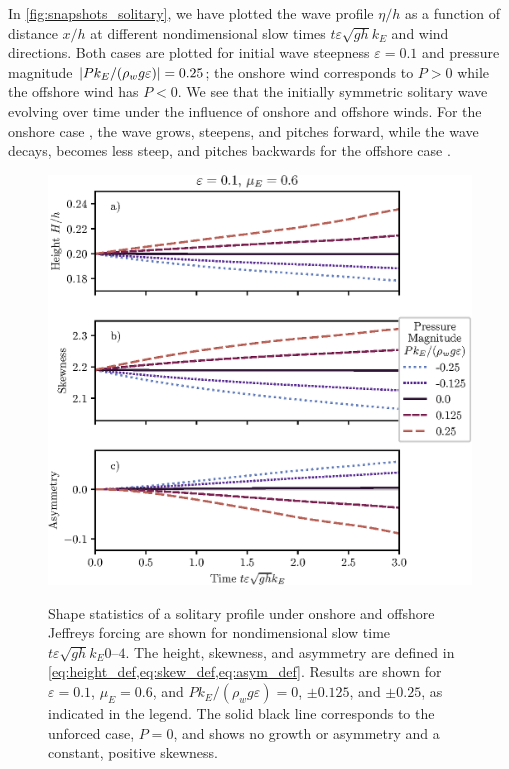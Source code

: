 \documentclass{jfm}
\renewcommand*{\epsilon}{\varepsilon}
\begin{document}
In \cref{fig:snapshots_solitary}, we have plotted the wave profile
$\eta/h$ as a function of distance $x/h$ at different nondimensional
slow times $t \epsilon \sqrt{g h} k_E$ and wind directions.
Both cases are plotted for initial wave steepness $\epsilon = 0.1$ and
pressure magnitude $\abs{P k_E/(\rho_w g \epsilon)} = 0.25$; the onshore
wind  corresponds to $P>0$ while the
offshore wind  has $P<0$.
We see that the initially symmetric solitary wave evolving over time
under the influence of  onshore and
 offshore winds.
For the onshore case , the wave grows,
steepens, and pitches forward, while the wave decays, becomes less
steep, and pitches backwards for the offshore case
.

\begin{figure}
  \centering
  { %
    \label{fig:statistics_solitary:a}
    \label{fig:statistics_solitary:b}
    \label{fig:statistics_solitary:c}
  }
  \includegraphics{Skew-Asymm-No-Peak.eps}
  \caption{
    Shape statistics of a solitary profile under onshore and offshore
    Jeffreys forcing are shown for nondimensional slow time $t \epsilon
    \sqrt{gh} k_E \numrange{0}{4}$.
    The
    height,
    skewness, and
    asymmetry are defined in
    \cref{eq:height_def,eq:skew_def,eq:asym_def}.
    Results are shown for $\epsilon=0.1$, $\mu_E = 0.6$, and $P
    k_E/(\rho_w g \epsilon) = 0$, $\pm 0.125$, and $\pm 0.25$, as
    indicated in the legend.
    The solid black line corresponds to the unforced case, $P = 0$, and
    shows no growth or asymmetry and a constant, positive skewness.
  }
  \label{fig:statistics_solitary}
\end{figure}
\end{document}
